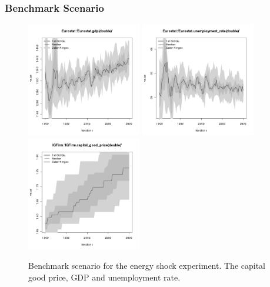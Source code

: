 \subsubsection*{Benchmark Scenario}
\begin{figure}[ht!]
\centering\leavevmode
\begin{minipage}{16cm}
\centering\leavevmode
\includegraphics[width=5cm]{./energy_shock/bench/Eurostat-gdp.png}
\includegraphics[width=5cm]{./energy_shock/bench/Eurostat-unemployment_rate.png}
\includegraphics[width=5cm]{./energy_shock/bench/IGFirm-capital_good_price.png}
\end{minipage}
\caption{Benchmark scenario for the energy shock experiment. The capital good price, GDP and unemployment rate.}
\label{Figure: benchmark}
\end{figure}

